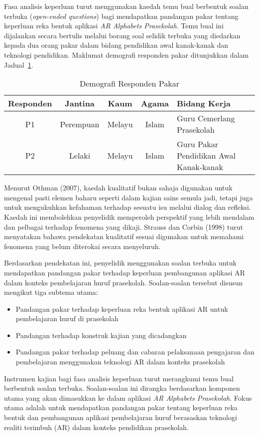 \begin{itemize}
Fasa analisis keperluan turut menggunakan kaedah temu bual berbentuk soalan terbuka (\textit{open-ended questions}) bagi mendapatkan pandangan pakar tentang keperluan reka bentuk aplikasi \textit{AR Alphabets Prasekolah}. Temu bual ini dijalankan secara bertulis melalui borang soal selidik terbuka yang diedarkan kepada dua orang pakar dalam bidang pendidikan awal kanak-kanak dan teknologi pendidikan. Maklumat demografi responden pakar ditunjukkan dalam Jadual~\ref{jadual:demografiPakar}.

\begin{table}[H]
\centering
\caption{Demografi Responden Pakar}
\label{jadual:demografiPakar}
\begin{tabular}{|c|c|c|c|p{5cm}|}
\hline
\textbf{Responden} & \textbf{Jantina} & \textbf{Kaum} & \textbf{Agama} & \textbf{Bidang Kerja} \\
\hline
P1 & Perempuan & Melayu & Islam & Guru Cemerlang Prasekolah \\
\hline
P2 & Lelaki & Melayu & Islam & Guru Pakar Pendidikan Awal Kanak-kanak \\
\hline
\end{tabular}
\end{table}

Menurut Othman (2007), kaedah kualitatif bukan sahaja digunakan untuk mengenal pasti elemen baharu seperti dalam kajian sains semula jadi, tetapi juga untuk mengukuhkan kefahaman terhadap sesuatu isu melalui dialog dan refleksi. Kaedah ini membolehkan penyelidik memperoleh perspektif yang lebih mendalam dan pelbagai terhadap fenomena yang dikaji. Strauss dan Corbin (1998) turut menyatakan bahawa pendekatan kualitatif sesuai digunakan untuk memahami fenomena yang belum diterokai secara menyeluruh.

Berdasarkan pendekatan ini, penyelidik menggunakan soalan terbuka untuk mendapatkan pandangan pakar terhadap keperluan pembangunan aplikasi AR dalam konteks pembelajaran huruf prasekolah. Soalan-soalan tersebut disusun mengikut tiga subtema utama:

\begin{itemize}
  \item Pandangan pakar terhadap keperluan reka bentuk aplikasi AR untuk pembelajaran huruf di prasekolah
  \item Pandangan terhadap konstruk kajian yang dicadangkan
  \item Pandangan pakar terhadap peluang dan cabaran pelaksanaan pengajaran dan pembelajaran menggunakan teknologi AR dalam konteks prasekolah
\end{itemize}
Instrumen kajian bagi fasa analisis keperluan turut merangkumi temu bual berbentuk soalan terbuka. Soalan-soalan ini dirangka berdasarkan komponen utama yang akan dimasukkan ke dalam aplikasi \textit{AR Alphabets Prasekolah}. Fokus utama adalah untuk mendapatkan pandangan pakar tentang keperluan reka bentuk dan pembangunan aplikasi pembelajaran huruf berasaskan teknologi realiti terimbuh (AR) dalam konteks pendidikan prasekolah.


\end{itemize}
